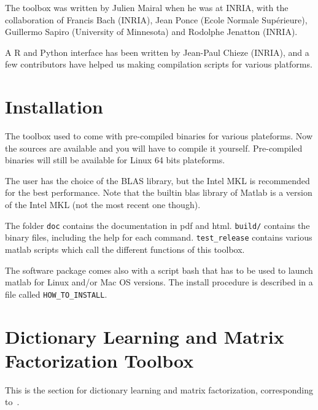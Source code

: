 \documentclass[a4paper, 11pt]{article}
\begin{document}
The toolbox was written by Julien Mairal when he was at INRIA, with the
collaboration of Francis Bach (INRIA), Jean Ponce (Ecole Normale Sup\'erieure),
Guillermo Sapiro (University of Minnesota) and Rodolphe Jenatton (INRIA).

A R and Python interface has been written by Jean-Paul Chieze (INRIA), and a
few contributors have helped us making compilation scripts for various platforms.

\section{Installation}
The toolbox used to come with pre-compiled binaries for various plateforms. 
Now the sources are available and you will have to compile it yourself.
Pre-compiled binaries will still be available for Linux 64 bits plateforms.

The user has the choice of the BLAS library, but the Intel 
MKL is recommended for the best performance. Note that the builtin blas library
of Matlab is a version of the Intel MKL (not the most recent one though).

The folder \verb|doc| contains the documentation in pdf and html. \verb|build/| contains the binary files, including the help for each command. \verb|test_release| contains various matlab scripts which call the different functions of this toolbox.

The software package comes also with a script bash that has to be used to launch matlab for Linux and/or Mac OS versions.
The install procedure is described in a file called \verb|HOW_TO_INSTALL|.

\section{Dictionary Learning and Matrix Factorization Toolbox}
This is the section for dictionary learning and matrix factorization, corresponding to~\cite{mairal7,mairal9}.
\end{document}
